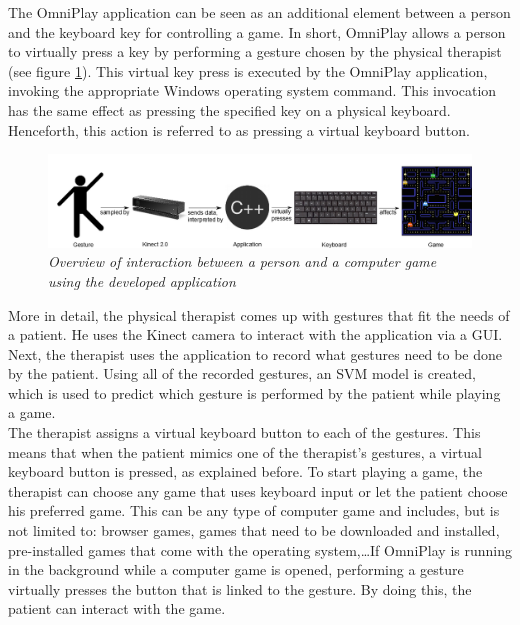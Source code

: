 The OmniPlay application can be seen as an additional element between a person and the keyboard key for controlling a game. In short, OmniPlay allows a person to virtually press a key by performing a gesture chosen by the physical therapist (see figure \ref{fig: overview_application_interaction}). This virtual key press is executed by the OmniPlay application, invoking the appropriate Windows operating system command. This invocation has the same effect as pressing the specified key on a physical keyboard. Henceforth, this action is referred to as pressing a virtual keyboard button.\\

\begin{figure}[H]
\begin{center}
\includegraphics[width=16cm]{Concept2.png}
\caption{\emph{Overview of interaction between a person and a computer game using the developed application}}
\label{fig: overview_application_interaction}
\end{center}
\end{figure}

More in detail, the physical therapist comes up with gestures that fit the needs of a patient. He uses the Kinect camera to interact with the application via a GUI. Next, the therapist uses the application to record what gestures need to be done by the patient. Using all of the recorded gestures, an SVM model is created, which is used to predict which gesture is performed by the patient while playing a game.\\

The therapist assigns a virtual keyboard button to each of the gestures. This means that when the patient mimics one of the therapist's gestures, a virtual keyboard button is pressed, as explained before. To start playing a game, the therapist can choose any game that uses keyboard input or let the patient choose his preferred game. This can be any type of computer game and includes, but is not limited to: browser games, games that need to be downloaded and installed, pre-installed games that come with the operating system,\ldots If OmniPlay is running in the background while a computer game is opened, performing a gesture virtually presses the button that is linked to the gesture. By doing this, the patient can interact with the game.\\

